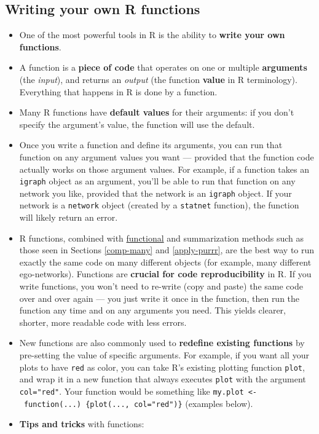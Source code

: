 \documentclass[
]{book}
\providecommand{\tightlist}{%
  \setlength{\itemsep}{0pt}\setlength{\parskip}{0pt}}
\begin{document}
\hypertarget{functions}{%
\subsection{Writing your own R functions}\label{functions}}

\begin{itemize}
\tightlist
\item
  One of the most powerful tools in R is the ability to \textbf{write your own functions}.
\item
  A function is a \textbf{piece of code} that operates on one or multiple \textbf{arguments} (the \emph{input}), and returns an \emph{output} (the function \textbf{value} in R terminology). Everything that happens in R is done by a function.
\item
  Many R functions have \textbf{default values} for their arguments: if you don't specify the argument's value, the function will use the default.
\item
  Once you write a function and define its arguments, you can run that function on any argument values you want --- provided that the function code actually works on those argument values. For example, if a function takes an \texttt{igraph} object as an argument, you'll be able to run that function on any network you like, provided that the network is an \texttt{igraph} object. If your network is a \texttt{network} object (created by a \texttt{statnet} function), the function will likely return an error.
\item
  R functions, combined with \href{https://adv-r.hadley.nz/functionals.html}{functional} and summarization methods such as those seen in Sections \ref{comp-many} and \ref{apply-purrr}, are the best way to run exactly the same code on many different objects (for example, many different ego-networks). Functions are \textbf{crucial for code reproducibility} in R. If you write functions, you won't need to re-write (copy and paste) the same code over and over again --- you just write it once in the function, then run the function any time and on any arguments you need. This yields clearer, shorter, more readable code with less errors.
\item
  New functions are also commonly used to \textbf{redefine existing functions} by pre-setting the value of specific arguments. For example, if you want all your plots to have \texttt{red} as color, you can take R's existing plotting function \texttt{plot}, and wrap it in a new function that always executes \texttt{plot} with the argument \texttt{col="red"}. Your function would be something like \texttt{my.plot\ \textless{}-\ function(...)\ \{plot(...,\ col="red")\}} (examples below).
\item
  \textbf{Tips and tricks} with functions:


\end{itemize}
\end{document}
